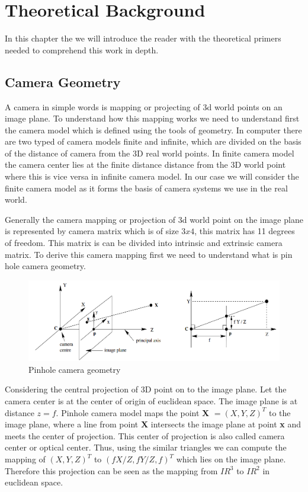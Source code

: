 

    \chapter{Theoretical Background}
    In this chapter the we will introduce the reader with the theoretical primers needed to comprehend this work in depth. 

    \section{Camera Geometry}
    A camera in simple words is mapping or projecting of 3d world points on an image plane. To understand how this mapping works we need to understand first the camera model which is defined using the tools of geometry. In computer there are two typed of camera models finite and infinite, which are divided on the basis of the distance of camera from the 3D real world points. In finite camera model the camera center lies at the finite distance distance from the 3D world point where this is vice versa in infinite camera model. In our case we will consider the finite camera model as it forms the basis of camera systems we use in the real world. 
    
    Generally the camera mapping or projection of 3d world point on the image plane is represented by camera matrix which is of size $3x4$, this matrix has 11 degrees of freedom. This matrix is can be divided into intrinsic and extrinsic camera matrix. To derive this camera mapping first we need to understand what is pin hole camera geometry. 
    
     \begin{figure}[h]
    \centering
    \includegraphics[width=\textwidth]{images/pinhole_camera.png}
    \caption{Pinhole camera geometry \cite{10.5555/861369}}
    \end{figure}
    
    Considering the central projection of 3D point  on to the image plane. Let the camera center is at the center of origin of euclidean space. The image plane is at distance $z = f$. Pinhole camera model maps the point  \textbf{X} $ = (X, Y, Z)^{T}$ to the image plane, where a line from point \textbf{X} intersects the image plane at point \textbf{x} and meets the center of projection. This center of projection is also called camera center or optical center. Thus, using the similar triangles we can compute the mapping of $ (X, Y, Z)^{T}$ to $(fX/Z, fY/Z, f)^{T}$ which lies on the image plane. Therefore this projection can be seen as the mapping from $IR^{3}$ to $IR^{2}$ in euclidean space. 
    
